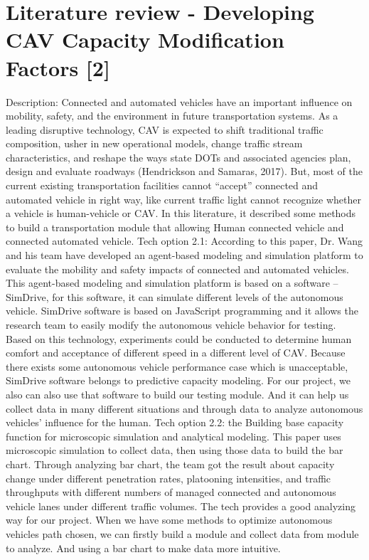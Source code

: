 \documentclass[draftclsnofoot,onecolumn]{IEEEtran}
\begin{document}
\section{Literature review - Developing CAV Capacity Modification Factors [2]}
Description: Connected and automated vehicles have an important influence on mobility, safety, and the environment in future transportation systems. As a leading disruptive technology, CAV is expected to shift traditional traffic composition, usher in new operational models, change traffic stream characteristics, and reshape the ways state DOTs and associated agencies plan, design and evaluate roadways (Hendrickson and Samaras, 2017). But, most of the current existing transportation facilities cannot “accept” connected and automated vehicle in right way, like current traffic light cannot recognize whether a vehicle is human-vehicle or CAV. In this literature, it described some methods to build a transportation module that allowing Human connected vehicle and connected automated vehicle.
\newline
Tech option 2.1: According to this paper, Dr. Wang and his team have developed an agent-based modeling and simulation platform to evaluate the mobility and safety impacts of connected and automated vehicles.
This agent-based modeling and simulation platform is based on a software – SimDrive, for this software, it can simulate different levels of the autonomous vehicle. SimDrive software is based on JavaScript programming and it allows the research team to easily modify the autonomous vehicle behavior for testing. Based on this technology, experiments could be conducted to determine human comfort and acceptance of different speed in a different level of CAV. Because there exists some autonomous vehicle performance case which is unacceptable, SimDrive software belongs to predictive capacity modeling.
For our project, we also can also use that software to build our testing module. And it can help us collect data in many different situations and through data to analyze autonomous vehicles’ influence for the human.
\newline
Tech option 2.2: the Building base capacity function for microscopic simulation and analytical modeling.
This paper uses microscopic simulation to collect data, then using those data to build the bar chart. Through analyzing bar chart, the team got the result about capacity change under different penetration rates, platooning intensities, and traffic throughputs with different numbers of managed connected and autonomous vehicle lanes under different traffic volumes. The tech provides a good analyzing way for our project. When we have some methods to optimize autonomous vehicles path chosen, we can firstly build a module and collect data from module to analyze. And using a bar chart to make data more intuitive.
\end{document}
